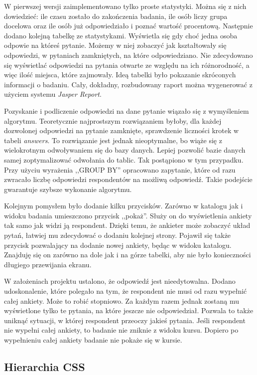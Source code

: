 W pierwszej wersji zaimplementowano tylko proste statystyki. Można się z nich dowiedzieć: ile czasu zostało do zakończenia badania, ile osób liczy grupa docelowa oraz ile osób już odpowiedziało i poznać wartość procentową. Następnie dodano kolejną tabelkę ze statystykami. Wyświetla się gdy choć jedna osoba odpowie na któreś pytanie. Możemy w niej zobaczyć jak kształtowały się odpowiedzi, w pytaniach zamkniętych, na które odpowiedziano. Nie zdecydowano się wyświetlać odpowiedzi na pytania otwarte ze względu na ich różnorodność, a więc ilość miejsca, które zajmowały. Ideą tabelki było pokazanie skróconych informacji o badaniu. Cały, dokładny, rozbudowany raport można wygenerować z użyciem systemu \emph{Jasper Report}.

Pozyskanie i podliczenie odpowiedzi na dane pytanie wiązało się z wymyśleniem algorytmu. Teoretycznie najprostszym rozwiązaniem byłoby, dla każdej dozwolonej odpowiedzi na pytanie zamknięte, sprawdzenie liczności krotek w tabeli \emph{answers}. To rozwiązanie jest jednak nieoptymalne, bo wiąże się z wielokrotnym odwoływaniem się do bazy danych. Lepiej pozwolić bazie danych samej zoptymalizować odwołania do tablic. Tak postąpiono w tym przypadku. Przy użyciu wyrażenia ,,GROUP BY'' opracowano zapytanie, które od razu zwracało liczbę odpowiedzi respondentów na możliwą odpowiedź. Takie podejście gwarantuje szybsze wykonanie algorytmu.

Kolejnym pomysłem było dodanie kilku przycisków. Zarówno w katalogu jak i widoku badania umieszczono przycisk ,,pokaż''. Służy on do wyświetlenia ankiety tak samo jak widzi ją respondent. Dzięki temu, że ankieter może zobaczyć układ pytań, łatwiej mu zdecydować o dodaniu kolejnej strony. Pojawił się także przycisk pozwalający na dodanie nowej ankiety, będąc w widoku katalogu. Znajduję się on zarówno na dole jak i na górze tabelki, aby nie było konieczności długiego przewijania ekranu.

W założeniach projektu ustalono, że odpowiedź jest nieedytowalna. Dodano udoskonalenie, które polegało na tym, że respondent nie musi od razu wypełnić całej ankiety. Może to robić stopniowo. Za każdym razem jednak zostaną mu wyświetlone tylko te pytania, na które jeszcze nie odpowiedział. Pozwala to także uniknąć sytuacji, w której respondent przeoczy jakieś pytania. Jeśli respondent nie wypełni całej ankiety, to badanie nie zniknie z widoku kursu. Dopiero po wypełnieniu całej ankiety badanie nie pokaże się w kursie.

\subsection{Hierarchia CSS}

